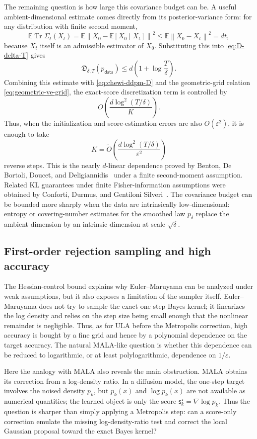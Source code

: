 \documentclass[10pt,a4paper]{amsart}
\numberwithin{equation}{section}
\DeclareMathOperator{\Tr}{Tr}
\newcommand{\E}{\mathbb{E}}
\newcommand{\eps}{\varepsilon}
\newcommand{\norm}[1]{\left\lVert #1 \right\rVert}
\newcommand{\pdata}{p_{\mathsf{data}}}
\newcommand{\sstar}{\mathsf{s}^{\star}}
\newcommand{\tO}{\widetilde O}
\begin{document}
The remaining question is how large this covariance budget can be.  A useful
ambient-dimensional estimate comes directly from its posterior-variance form:
for any distribution with finite second moment,
\[
    \E\Tr\Sigma_t(X_t)
    =
    \E\norm{X_0-\E[X_0\mid X_t]}^2
    \leq
    \E\norm{X_0-X_t}^2
    =
    dt,
\]
because $X_t$ itself is an admissible estimator of $X_0$.  Substituting this
into \eqref{eq:D-delta-T} gives
\[
    \mathfrak D_{\delta,T}(\pdata)
    \leq
    d\left(1+\log\frac{T}{\delta}\right).
\]
Combining this estimate with \eqref{eq:chewi-ddpm-D} and the geometric-grid
relation \eqref{eq:geometric-ve-grid}, the exact-score discretization term is
controlled by
\[
    O\!\left(
        \frac{d\log^2(T/\delta)}{K}
    \right).
\]
Thus, when the initialization and score-estimation errors are also
$O(\eps^2)$, it is enough to take
\[
    K=\tO\!\left(
        \frac{d\log^2(T/\delta)}{\eps^2}
    \right)
\]
reverse steps.  This is the nearly $d$-linear dependence proved by Benton,
De Bortoli, Doucet, and Deligiannidis~\cite{benton2024nearlydlinear} under a
finite second-moment assumption. Related KL guarantees under finite
Fisher-information assumptions were obtained by Conforti, Durmus, and
Gentiloni Silveri~\cite{conforti2024klscore}.  The covariance budget can be bounded
more sharply when the data are intrinsically low-dimensional: entropy or
covering-number estimates for the smoothed law $p_\delta$ replace the ambient
dimension by an intrinsic dimension at scale $\sqrt\delta$.

\subsection{First-order rejection sampling and high accuracy}

The Hessian-control bound explains why Euler--Maruyama can be analyzed under
weak assumptions, but it also exposes a limitation of the sampler itself.
Euler--Maruyama does not try to sample the exact one-step Bayes kernel; it
linearizes the log density and relies on the step size being small enough that
the nonlinear remainder is negligible.  Thus, as for ULA before the
Metropolis correction, high accuracy is bought by a fine grid and hence by a
polynomial dependence on the target accuracy.  The natural MALA-like question
is whether this dependence can be reduced to logarithmic, or at least
polylogarithmic, dependence on $1/\eps$.

Here the analogy with MALA also reveals the main obstruction.  MALA obtains its
correction from a log-density ratio.  In a diffusion model, the one-step target
involves the noised density $p_k$, but $p_k(x)$ and $\log p_k(x)$ are not
available as numerical quantities; the learned object is only the score
$\sstar_k=\nabla\log p_k$.  Thus the question is sharper than simply applying a
Metropolis step: can a score-only correction emulate the missing
log-density-ratio test and correct the local Gaussian proposal toward the exact
Bayes kernel?
\end{document}
